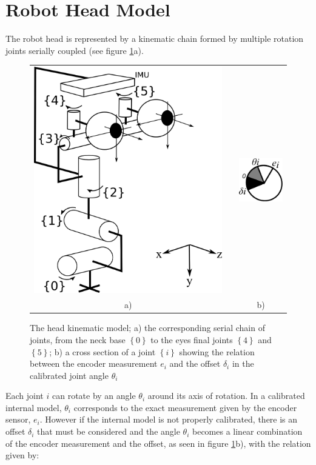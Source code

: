 \section{Robot Head Model}
\label{sec:head_calibration_system}

The robot head is represented by a kinematic chain formed by multiple rotation joints serially coupled (see figure \ref{fig:head_kinematic_model_prob_form}a). 

\begin{figure}
\centering
    \centering
    \begin{tabular}{ccc}
    \includegraphics[width=0.3\columnwidth]{images/Head_Kinematic_Model_v2} & &
    \includegraphics[width=0.15\columnwidth]{images/offset_model} \\
    a) & & b)
    \end{tabular}
    \caption{The head kinematic model; a) the corresponding serial chain of joints, from the neck base $\left\{ 0\right\} $ to the eyes final joints $\left\{ 4\right\} $ and $\left\{ 5\right\} $; b) a cross section of a joint $\left\{ i\right\} $ showing the relation between the encoder measurement $e_i$ and the offset $\delta_i$ in the calibrated joint angle $\theta_i$}
\label{fig:head_kinematic_model_prob_form}
\end{figure}

Each joint $i$ can rotate by an angle $\theta_i$ around its axis of rotation. In a calibrated internal model, $\theta_{i}$ corresponds to the exact measurement given by the encoder sensor, $e_i$. However if the internal model is not properly calibrated, there is an offset $\delta_{i}$ that must be considered and the angle $\theta_{i}$ becomes a linear combination of the encoder measurement and the offset, as seen in figure \ref{fig:head_kinematic_model_prob_form}b), with the relation given by:


